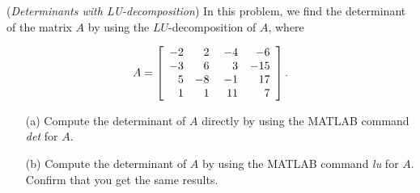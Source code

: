 \begin{exer}(\textit{Determinants with LU-decomposition})
In this problem, we find the determinant of the matrix $A$ by using the $LU$-decomposition of $A$, where

\begin{displaymath}
A = \left[\begin{array}{rrrr} -2& \hspace{1mm} 2& \hspace{1mm}-4& \hspace{2mm} -6\\ -3 & 6 & 3 & -15 \\ 5 & -8 & -1 & 17 \\ 1 & 1 & 11 & 7 \end{array} \right].
\end{displaymath}
\vspace{1mm}
\begin{enumerate}
\item[(a)] Compute the determinant of $A$ directly by using the MATLAB command \textit{det} for $A$.
\vspace{1mm}
\item[(b)] Compute the determinant of $A$ by using the MATLAB command \textit{lu} for $A$. Confirm that you get the same results.
\end{enumerate}

\end{exer}


